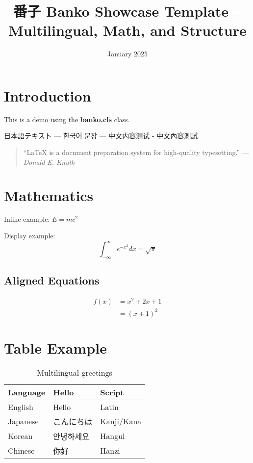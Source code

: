 \documentclass{banko}
\title{番子 Banko Showcase Template – Multilingual, Math, and Structure}
\date{January 2025}
\begin{document}
	
	\maketitle
	
	\romanPage
	
	\tableofcontents
	
	\clearpage
	\arabicPage
	
	\section{Introduction}
	This is a demo using the \textbf{banko.cls} class.
	
	日本語テキスト — 한국어 문장 — 中文内容测试 - 中文內容測試.
	
	\begin{quote}
		“LaTeX is a document preparation system for high-quality typesetting.” — \textit{Donald E. Knuth}
	\end{quote}
	
	\section{Mathematics}
	Inline example: \( E = mc^2 \)
	
	Display example:
	\[
	\int_{-\infty}^\infty e^{-x^2} dx = \sqrt{\pi}
	\]
	
	\subsection{Aligned Equations}
	\begin{align}
		f(x) &= x^2 + 2x + 1 \\
		&= (x + 1)^2
	\end{align}
	
	\section{Table Example}
	\begin{table}[h!]
		\centering
		\begin{tabular}{@{}lll@{}}
			\toprule
			Language   & Hello       & Script         \\ \midrule
			English    & Hello       & Latin          \\
			Japanese   & こんにちは   & Kanji/Kana     \\
			Korean     & 안녕하세요   & Hangul         \\
			Chinese    & 你好         & Hanzi          \\
			\bottomrule
		\end{tabular}
		\caption{Multilingual greetings}
	\end{table}
	
\end{document}
